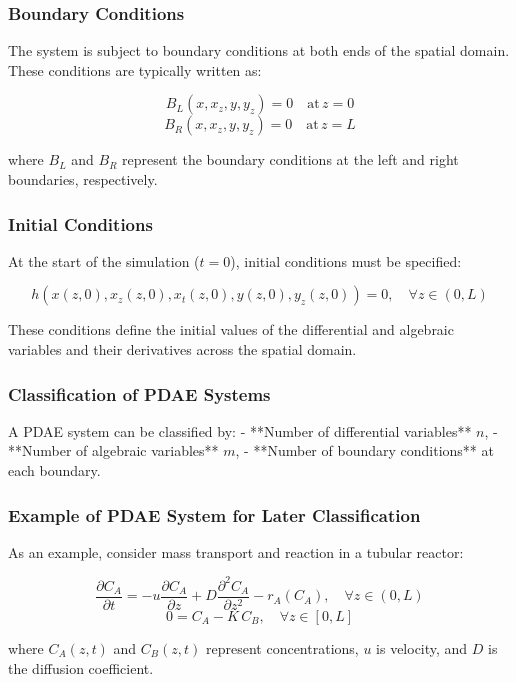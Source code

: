 \documentclass{article}
\begin{document}
\subsubsection{Boundary Conditions}

The system is subject to boundary conditions at both ends of the spatial domain. These conditions are typically written as:

\[
B_L(x, x_z, y, y_z) = 0 \quad \text{at} \, z = 0
\]
\[
B_R(x, x_z, y, y_z) = 0 \quad \text{at} \, z = L
\]

where \(B_L\) and \(B_R\) represent the boundary conditions at the left and right boundaries, respectively.

\subsubsection{Initial Conditions}

At the start of the simulation (\(t = 0\)), initial conditions must be specified:

\[
h(x(z,0), x_z(z,0), x_t(z,0), y(z,0), y_z(z,0)) = 0, \quad \forall z \in (0, L)
\]

These conditions define the initial values of the differential and algebraic variables and their derivatives across the spatial domain.

\subsubsection{Classification of PDAE Systems}

A PDAE system can be classified by:
- **Number of differential variables** \(n\),
- **Number of algebraic variables** \(m\),
- **Number of boundary conditions** at each boundary.

\subsubsection{Example of PDAE System for Later Classification}

As an example, consider mass transport and reaction in a tubular reactor:

\[
\frac{\partial C_A}{\partial t} = -u \frac{\partial C_A}{\partial z} + D \frac{\partial^2 C_A}{\partial z^2} - r_A(C_A), \quad \forall z \in (0, L)
\]
\[
0 = C_A - K \, C_B, \quad \forall z \in [0, L]
\]

where \(C_A(z,t)\) and \(C_B(z,t)\) represent concentrations, \(u\) is velocity, and \(D\) is the diffusion coefficient.
\end{document}
